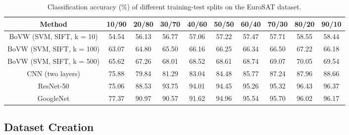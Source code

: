 \documentclass[journal]{IEEEtran}
\begin{document}
\begin{table*}[ht!]
\centering
\caption{Classification accuracy (\%) of different training-test splits on the EuroSAT dataset.}
\begin{tabular}{|c|c|c|c|c|c|c|c|c|c|} 
    \hline
    \textbf{Method} & \textbf{10/90} & \textbf{20/80} & \textbf{30/70} & \textbf{40/60} & \textbf{50/50} & \textbf{60/40}& \textbf{70/30}& \textbf{80/20} & \textbf{90/10}\\
    \hline
    BoVW (SVM, SIFT, k = 10)& 54.54 & 56.13 & 56.77 & 57.06 & 57.22 & 57.47 & 57.71 & 58.55 & 58.44\\
    \hline
    BoVW (SVM, SIFT, k = 100)& 63.07 & 64.80 & 65.50 & 66.16 & 66.25 & 66.34 & 66.50 & 67.22 & 66.18\\
    \hline
    BoVW (SVM, SIFT, k = 500)& 65.62 & 67.26 & 68.01 & 68.52 & 68.61 & 68.74 & 69.07 & 70.05 & 69.54\\
    \hline
    CNN (two layers)& 75.88 & 79.84 & 81.29 & 83.04 & 84.48 & 85.77 & 87.24 & 87.96 & 88.66 \\
    \hline
    ResNet-50 & 75.06 & 88.53 & 93.75 & 94.01 & 94.45 & 95.26 & 95.32 & 96.43  & 96.37 \\ 
    \hline
    GoogleNet & 77.37 & 90.97 & 90.57 & 91.62 & 94.96 & 95.54 & 95.70 & 96.02 & 96.17 \\ 

    
    
\hline
\end{tabular}
\label{table:dataset_accuracies_splits}
\end{table*}


\subsection{Dataset Creation}
\end{document}
